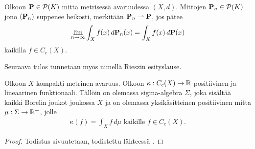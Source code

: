 \documentclass[12pt,oneside,a4paper]{amsbook} %
\begin{document}
\begin{definition} \label{def:weakConv}
    Olkoon $\P \in \mathcal{P}(K)$ mitta metrisessä avaruudessa $(X, d)$. Mittojen $\P_n \in \mathcal{P}(K)$ jono $(\P_n)$ suppenee heikosti, merkitään $\P_n \rightharpoonup \P$, jos pätee 
    \begin{equation*}
        \lim_{n\to\infty} \int_X f(x) \, d\P_n (x) = \int_X f(x) \, d\P(x)
    \end{equation*}
    kaikilla $f \in C_c(X)$.
\end{definition}

Seuraava tulos tunnetaan myös nimellä Rieszin esityslause.

\begin{theorem}\label{thm:Riesz}
    Olkoon $X$ kompakti metrinen avaruus. Olkoon $\kappa:C_c(X) \to \R$ positiivinen ja lineaarinen funktionaali. Tällöin on olemassa sigma-algebra $\Sigma$, joka sisältää kaikki Borelin joukot joukossa $X$ ja on olemassa yksikäsitteinen positiivinen mitta $\mu:\Sigma \to \Rp$, jolle
    \begin{align*}
        \kappa (f) = \int_X f \, d\mu \text{ kaikille } f \in C_c(X).
    \end{align*}
\end{theorem}
\begin{proof}
    Todistus sivuutetaan, todistettu lähteessä \cite[s. 40]{rudin}.
\end{proof}
\end{document}
